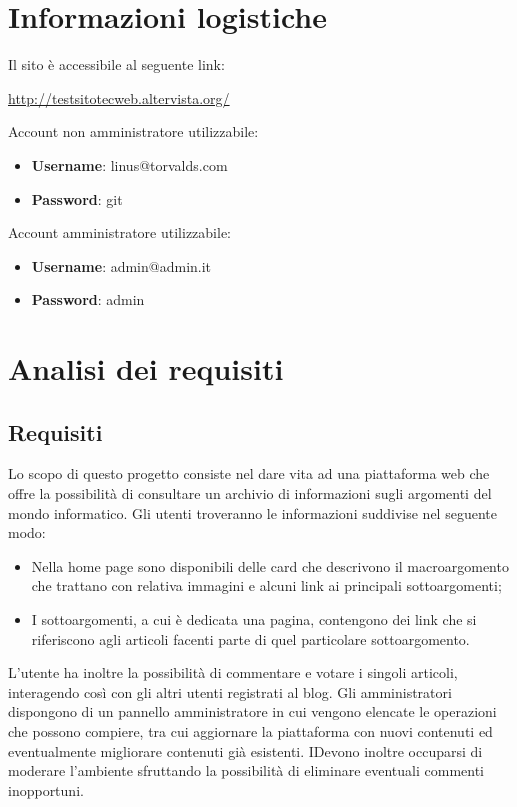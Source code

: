 \documentclass[12pt]{article}
\begin{document}
	
	\section*{Informazioni logistiche}
	
	Il sito è accessibile al seguente link:
	\begin{center}
		\url{http://testsitotecweb.altervista.org/}
	\end{center}

	Account non amministratore utilizzabile:
	\begin{itemize}
		\item \textbf{Username}: linus@torvalds.com
		\item \textbf{Password}: git
	\end{itemize}

	Account amministratore utilizzabile:
	\begin{itemize}
		\item \textbf{Username}: admin@admin.it
		\item \textbf{Password}: admin
	\end{itemize}

	\section{Analisi dei requisiti}
		\subsection{Requisiti}
		Lo scopo di questo progetto consiste nel dare vita ad una piattaforma web che offre la possibilità di consultare un archivio di informazioni sugli argomenti del mondo informatico. Gli utenti troveranno le informazioni suddivise nel seguente modo:
		\begin{itemize}
			\item Nella home page sono disponibili delle card che descrivono il macroargomento che trattano con relativa immagini e alcuni link ai principali sottoargomenti;
			\item I sottoargomenti, a cui è dedicata una pagina, contengono dei link che si riferiscono agli articoli facenti parte di quel particolare sottoargomento.
		\end{itemize}
		 L'utente ha inoltre la possibilità di commentare e votare i singoli articoli, interagendo così con gli altri utenti registrati al blog. Gli amministratori dispongono di un pannello amministratore in cui vengono elencate le operazioni che possono compiere, tra cui aggiornare la piattaforma con nuovi contenuti ed eventualmente migliorare contenuti già esistenti.
		IDevono inoltre occuparsi di moderare l'ambiente sfruttando la possibilità di eliminare eventuali commenti inopportuni.
\end{document}
